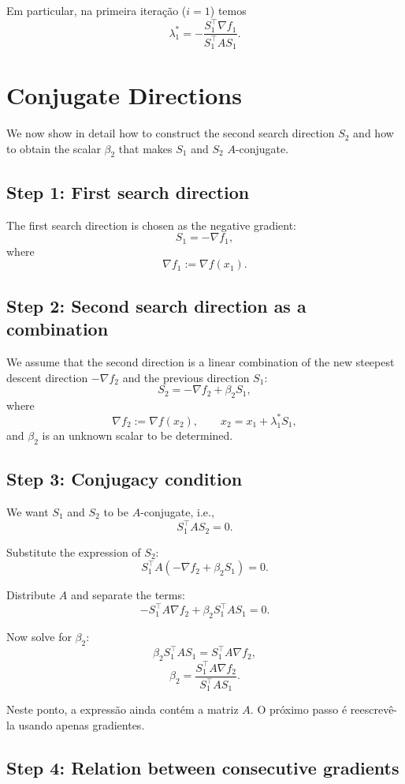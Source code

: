 \documentclass[9pt,a4paper]{extarticle}
\begin{document}
Em particular, na primeira iteração ($i=1$) temos
\[
\lambda_1^* = -\frac{S_1^\top \nabla f_1}{S_1^\top A S_1}.
\]


\section{Conjugate Directions}

We now show in detail how to construct the second search direction $S_2$ and how to obtain
the scalar $\beta_2$ that makes $S_1$ and $S_2$ $A$-conjugate.

\subsection*{Step 1: First search direction}

The first search direction is chosen as the negative gradient:
\[
S_1 = - \nabla f_1,
\]
where
\[
\nabla f_1 := \nabla f(x_1).
\]

\subsection*{Step 2: Second search direction as a combination}

We assume that the second direction is a linear combination of the new steepest descent
direction $-\nabla f_2$ and the previous direction $S_1$:
\[
S_2 = -\nabla f_2 + \beta_2 S_1,
\]
where
\[
\nabla f_2 := \nabla f(x_2),
\qquad
x_2 = x_1 + \lambda_1^* S_1,
\]
and $\beta_2$ is an unknown scalar to be determined.

\subsection*{Step 3: Conjugacy condition}

We want $S_1$ and $S_2$ to be $A$-conjugate, i.e.,
\[
S_1^\top A S_2 = 0.
\]

Substitute the expression of $S_2$:
\[
S_1^\top A(-\nabla f_2 + \beta_2 S_1) = 0.
\]

Distribute $A$ and separate the terms:
\[
- S_1^\top A \nabla f_2 + \beta_2 S_1^\top A S_1 = 0.
\]

Now solve for $\beta_2$:
\[
\beta_2 S_1^\top A S_1 = S_1^\top A \nabla f_2,
\]
\[
\beta_2 = \frac{S_1^\top A \nabla f_2}{S_1^\top A S_1}.
\]

Neste ponto, a expressão ainda contém a matriz $A$. O próximo passo é reescrevê-la usando apenas gradientes.

\subsection*{Step 4: Relation between consecutive gradients}
\end{document}
